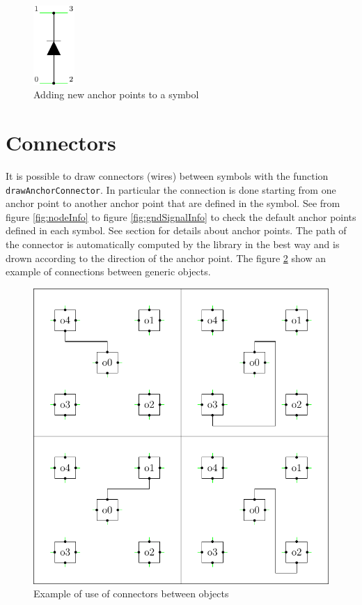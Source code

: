 \documentclass[a4paper,12pt]{report}
\begin{document}
\begin{figure}[ht]
  \centering
  \includegraphics[width=0.14\textwidth]{anchorExample3.pdf}
  \caption{Adding new anchor points to a symbol}
  \label{fig:anchorExample3}
\end{figure}

\clearpage
\section*{Connectors}
\label{sct:connector}

It is possible to draw connectors (wires) between symbols with the function \texttt{drawAnchorConnector}. In particular the connection is done starting from one anchor point to another anchor point that are defined in the symbol. See from figure \ref{fig:nodeInfo} to figure \ref{fig:gndSignalInfo} to check the default anchor points defined in each symbol. See section  for details about anchor points. The path of the connector is automatically computed by the library in the best way and is drown according to the direction of the anchor point. The figure \ref{fig:connectorExample} show an example of connections between generic objects.

\begin{figure}[ht]
  \centering
  \includegraphics[width=1.0\textwidth]{N-S}
  \caption{Example of use of connectors between objects}
  \label{fig:connectorExample}
\end{figure}
\end{document}
